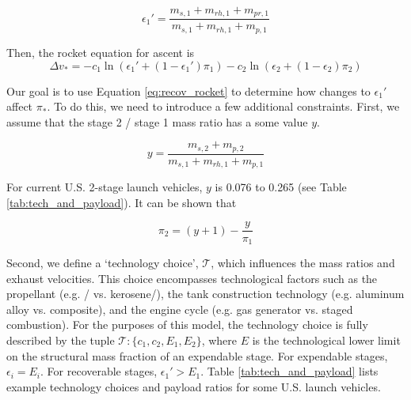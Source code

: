 \documentclass[conf]{new-aiaa}
\begin{document}
\begin{equation}
\label{eq:epsilon_1_prime}
\epsilon_1' = \frac{m_{s,1} + m_{rh,1} + m_{pr,1}}{m_{s,1} + m_{rh,1} + m_{p,1}}
\end{equation}

Then, the rocket equation for ascent is
\begin{equation}
\label{eq:recov_rocket}
\Delta v_* =  - c_1 \ln\left( \epsilon_1' + (1 - \epsilon_1') \pi_1 \right) - c_2 \ln\left( \epsilon_2 + (1 - \epsilon_2) \pi_2 \right)
\end{equation}

Our goal is to use Equation \ref{eq:recov_rocket} to determine how changes to $\epsilon_1'$ affect $\pi_*$. To do this, we need to introduce a few additional constraints. First, we assume that the stage 2 / stage 1 mass ratio has a some value $y$.

\begin{equation}
y = \frac{m_{s,2} + m_{p,2}}{m_{s,1} + m_{rh,1} + m_{p,1}}
\end{equation}

For current U.S. 2-stage launch vehicles, $y$ is 0.076 to 0.265 (see Table \ref{tab:tech_and_payload}). It can be shown that

\begin{equation}
\label{eq:ypi}
\pi_2 = (y + 1) - \frac{y}{\pi_1}
\end{equation}

Second, we define a `technology choice', $\mathcal{T}$, which influences the mass ratios and exhaust velocities. This choice encompasses technological factors such as the propellant (e.g. / vs. kerosene/), the tank construction technology (e.g. aluminum alloy vs. composite), and the engine cycle (e.g. gas generator vs. staged combustion). For the purposes of this model, the technology choice is fully described by the tuple $\mathcal{T} : \{ c_1, c_2, E_1, E_2 \}$, where $E$ is the technological lower limit on the structural mass fraction of an expendable stage. For expendable stages, $\epsilon_i = E_i$. For recoverable stages, $\epsilon_1' > E_1$. Table \ref{tab:tech_and_payload} lists example technology choices and payload ratios for some U.S. launch vehicles.
\end{document}
